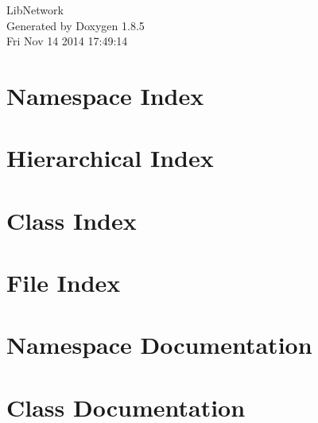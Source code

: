 \documentclass[twoside]{book}
\newcommand{\clearemptydoublepage}{%
  \newpage{\pagestyle{empty}\cleardoublepage}%
}
\begin{document}
\hypersetup{pageanchor=false}
\begin{titlepage}
\vspace*{7cm}
\begin{center}%
{\Large Lib\-Network }\\
\vspace*{1cm}
{\large Generated by Doxygen 1.8.5}\\
\vspace*{0.5cm}
{\small Fri Nov 14 2014 17:49:14}\\
\end{center}
\end{titlepage}
\clearemptydoublepage
\tableofcontents
\clearemptydoublepage
{}
\hypersetup{pageanchor=true}

\chapter{Namespace Index}

\chapter{Hierarchical Index}

\chapter{Class Index}

\chapter{File Index}

\chapter{Namespace Documentation}

\chapter{Class Documentation}


















\end{document}

